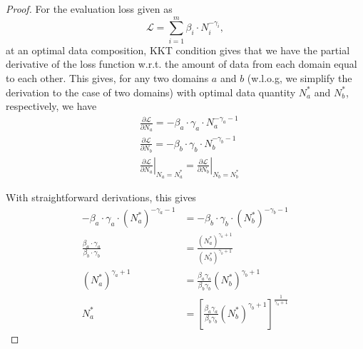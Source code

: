 \documentclass{article} %
\begin{document}
\begin{appendices}{}
\begin{proof} For the evaluation loss given as 
\begin{equation*}
\mathcal{L}
=\sum_{i=1}^m \beta_i\cdot N_i^{-\gamma_i},
\end{equation*}
at an optimal data composition, KKT condition \citep{bertsekas1997nonlinear} gives that
we have the partial derivative of the loss function w.r.t. the amount of data from each domain equal to each other. This gives, for any two domains $a$ and $b$ (w.l.o.g, we simplify the derivation to the case of two domains) with optimal data quantity $N_a^*$ and $N_b^*$, respectively, we have
\begin{equation*}
\begin{aligned}
&\frac{\partial\mathcal{L}}{\partial N_a}=-\beta_a\cdot\gamma_a\cdot N_a^{-\gamma_a-1}\\
&\frac{\partial\mathcal{L}}{\partial N_b}=-\beta_b\cdot\gamma_b\cdot N_b^{-\gamma_b-1} \\
&\left.\frac{\partial\mathcal{L}}{\partial N_a}\right|_{N_a=N_a^*}= \left.\frac{\partial\mathcal{L}}{\partial N_b}\right|_{N_b=N_b^*}
\end{aligned}
\end{equation*}

With straightforward derivations, this gives
\begin{equation}\label{eq:nanb}
\begin{aligned}
-\beta_a\cdot\gamma_a\cdot (N_a^*)^{-\gamma_a-1} &=-\beta_b\cdot\gamma_b\cdot (N_b^*)^{-\gamma_b-1} \\
\frac{\beta_a\cdot\gamma_a}{\beta_b\cdot\gamma_b}&=\frac{(N_a^*)^{\gamma_a+1}}{(N_b^*)^{\gamma_b+1}} \\
(N_a^*)^{\gamma_a+1}&=\frac{\beta_a\gamma_a}{\beta_b\gamma_b}(N_b^*)^{\gamma_b+1}\\
N_a^*&=\left[\frac{\beta_a\gamma_a}{\beta_b\gamma_b} (N_b^*)^{\gamma_b+1}\right]^{\frac{1}{\gamma_a+1}}
\end{aligned}
\end{equation}


\end{proof}
\end{appendices}
\end{document}
